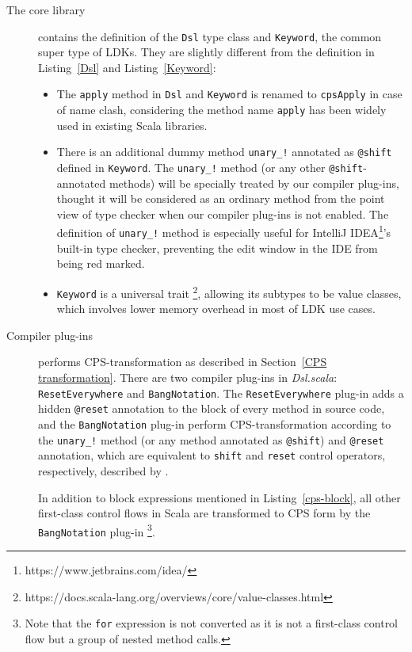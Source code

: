 \begin{description}
  \item[The core library] contains the definition of the \lstinline{Dsl} type class and \lstinline{Keyword}, the common super type of LDKs. They are slightly different from the definition in Listing~\ref{Dsl} and Listing~\ref{Keyword}:
  \begin{itemize}
    \item The \lstinline{apply} method in \lstinline{Dsl} and \lstinline{Keyword} is renamed to \lstinline{cpsApply} in case of name clash, considering the method name \lstinline{apply} has been widely used in existing Scala libraries.
    \item There is an additional dummy method \lstinline{unary_!} annotated as \lstinline{@shift} defined in \lstinline{Keyword}. The \lstinline{unary_!} method (or any other \lstinline{@shift}-annotated methods) will be specially treated by our compiler plug-ins, thought it will be considered as an ordinary method from the point view of type checker when our compiler plug-ins is not enabled. The definition of \lstinline{unary_!} method is especially useful for IntelliJ IDEA\footnote{https://www.jetbrains.com/idea/}'s built-in type checker, preventing the edit window in the IDE from being red marked.
    \item \lstinline{Keyword} is a universal trait \footnote{https://docs.scala-lang.org/overviews/core/value-classes.html}, allowing its subtypes to be value classes, which involves lower memory overhead in most of LDK use cases.
  \end{itemize}
  \item[Compiler plug-ins] performs CPS-transformation as described in Section~\ref{CPS transformation}. There are two compiler plug-ins in \textit{Dsl.scala}: \lstinline{ResetEverywhere} and \lstinline{BangNotation}. The \lstinline{ResetEverywhere} plug-in adds a hidden \lstinline{@reset} annotation to the block of every method in source code, and the \lstinline{BangNotation} plug-in perform CPS-transformation according to the \lstinline{unary_!} method (or any method annotated as \lstinline{@shift}) and \lstinline{@reset} annotation, which are equivalent to \lstinline{shift} and \lstinline{reset} control operators, respectively, described by \cite{Danvy89afunctional}.

  In addition to block expressions mentioned in Listing~\ref{cps-block}, all other first-class control flows in Scala are transformed to CPS form by the \lstinline{BangNotation} plug-in \footnote{Note that the \lstinline{for} expression is not converted as it is not a first-class control flow but a group of nested method calls.}.


\end{description}
